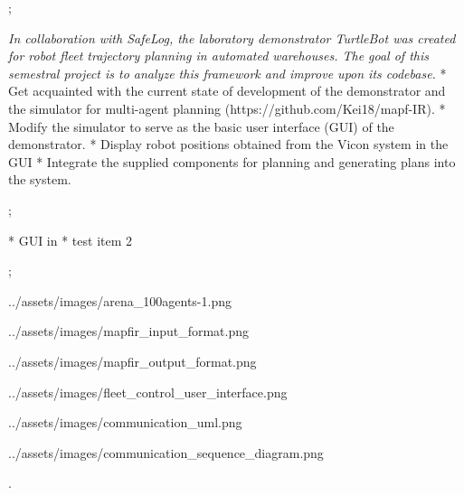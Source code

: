 

\worktype[B/EN]
\slideshow



\pg;


\textit {
    In collaboration with SafeLog, the laboratory demonstrator TurtleBot was created
    for robot fleet trajectory planning in automated warehouses. The goal of this semestral
    project is to analyze this framework and improve upon its codebase.
}
\begitems
* Get acquainted with the current state of development of the demonstrator and the simulator for multi-agent planning (https://github.com/Kei18/mapf-IR).
* Modify the simulator to serve as the basic user interface (GUI) of the demonstrator.
* Display robot positions obtained from the Vicon system in the GUI
* Integrate the supplied components for planning and generating plans into the system.
\enditems
\nl

\pg;





\begitems
* GUI in 
* test item 2
\enditems
\nl

\pg;

\centerline{\picw=14cm \inspic ../assets/images/arena_100agents-1.png }


\centerline{\picw=5cm \inspic ../assets/images/mapfir_input_format.png }
\centerline{\picw=5cm \inspic ../assets/images/mapfir_output_format.png }


\centerline{\picw=5cm \inspic ../assets/images/fleet_control_user_interface.png }


\centerline{\picw=5cm \inspic ../assets/images/communication_uml.png}


\centerline{\picw=5cm \inspic ../assets/images/communication_sequence_diagram.png}


\pg.